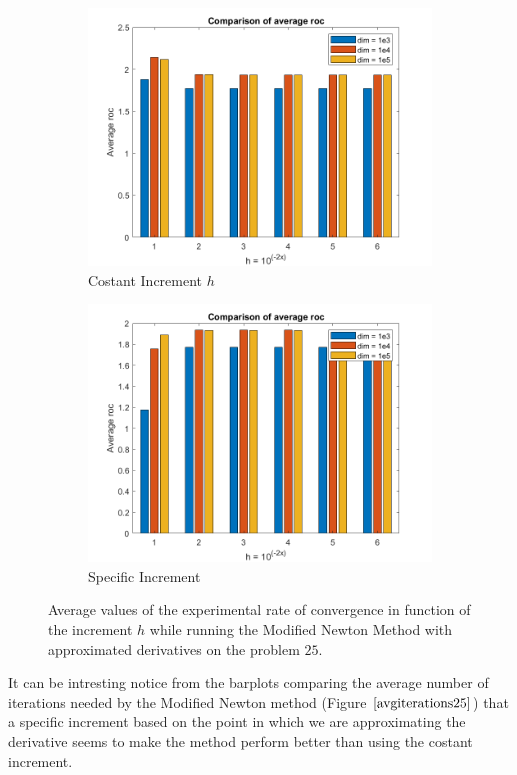 \begin{figure}[htbp]
    \centering
    \begin{subfigure}[t]{0.45\textwidth}  %
        \centering
        \includegraphics[width=\textwidth]{img/pb76_MN_difffinite_COST_rateofconv.png}
        \caption{Costant Increment $h$}
    \end{subfigure}
    \hspace{1cm} %
    \begin{subfigure}[t]{0.45\textwidth}
        \centering
        \includegraphics[width=\textwidth]{img/pb76_MN_difffinite_REL_rateofconv.png}
        \caption{Specific Increment }
    \end{subfigure}
    \caption{ \small Average values of the experimental rate of convergence in function of the increment $h$  while running the Modified Newton Method with approximated derivatives on the problem $25$.}
\end{figure}


It can be intresting notice from the barplots comparing the average number of iterations needed by the Modified Newton method (Figure $\eqref{avgiterations25}$) that a specific increment based on the point in which we are approximating the derivative seems to make the method perform better than using the costant increment.  